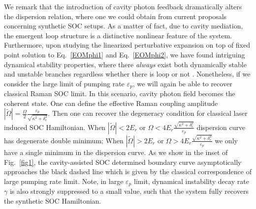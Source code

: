 \documentclass[atoms,article,submit,moreauthors,pdftex,12pt,a4paper]{mdpi}
\begin{document}

We remark that the introduction of cavity photon feedback dramatically alters the dispersion relation, where one we could obtain from current proposals concerning synthetic SOC setups. As a matter of fact, due to cavity mediation, the emergent loop structure is a distinctive nonlinear feature of the system. Furthermore, upon studying the linearized perturbative expansion on top of fixed point solution to Eq.~\ref{EOMphi1} and Eq.~\ref{EOMphi2}, we have found intriguing dynamical stability properties, where there {\em always} exist both dynamically stable and unstable branches regardless whether there is loop or not \cite{cavitySOC}. Nonetheless, if we consider the large limit of pumping rate $\varepsilon_p$, we will again be able to recover classical Raman SOC limit. In this scenario, cavity photon field becomes the coherent state. One can define the effective Raman coupling amplitude $|\tilde{\Omega}|=\frac{\Omega}{2}\frac{\varepsilon_p}{\sqrt{\kappa^2+\delta_c^2}}$. Then one can recover the degeneracy condition for classical laser induced SOC Hamiltonian. When $|\tilde{\Omega}|<2E_r$ or $\Omega<4E_r\frac{\sqrt{\kappa^2+\delta_c^2}}{\varepsilon_p}$ dispersion curve has degenerate double minimum; When $|\tilde{\Omega}|>2E_r$ or $\Omega>4E_r\frac{\sqrt{\kappa^2+\delta_c^2}}{\varepsilon_p}$ we only have a single minimum in the dispersion curve. As we show in the inset of Fig.~\ref{fig1}, the cavity-assisted SOC determined boundary curve asymptotically approaches the black dashed line which is given by the classical correspondence of large pumping rate limit. Note, in large $\varepsilon_p$ limit, dynamical instability decay rate $\gamma$ is also strongly suppressed to a small value, such that the system fully recovers the synthetic SOC Hamiltonian. 
\end{document}
